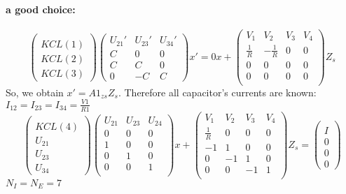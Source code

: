 \paragraph{a good choice:}
\[\left(\begin{array}{c}
  \\
KCL(1)\\KCL(2)\\KCL(3)
\end{array}\right)
\left(\begin{array}{ccc}
  U_{21}'&U_{23}'&U_{34}'\\
  \hline
  C&0&0\\
  C&C&0\\
  0&-C&C
\end{array}\right)x'=0x+
\left(\begin{array}{cccc}
  V_{1}&V_{2}&V_{3}&V_{4}\\
  \hline
  \frac{1}{R}&-\frac{1}{R}&0&0\\
  0&0&0&0\\
  0&0&0&0\\
\end{array}\right)Z_{s}
 \]
 So, we obtain $x'=A1_{zs}Z_{s}$. Therefore all capacitor's currents are known: $I_{12}=I_{23}=I_{34}=\frac{V1}{R1}$\\
 \[\left(\begin{array}{c}
  \\
KCL(4)\\U_{21}\\U_{23}\\U_{34}
\end{array}\right)
 \left(\begin{array}{ccc}
  U_{21}&U_{23}&U_{24}\\
  \hline
  0&0&0\\
  1&0&0\\
  0&1&0\\
  0&0&1\\
\end{array}\right)x+
 \left(\begin{array}{cccc}
  V_{1}&V_{2}&V_{3}&V_{4}\\
  \hline
  \frac{1}{R}&0&0&0\\
  -1&1&0&0\\
  0&-1&1&0\\
  0&0&-1&1\\
\end{array}\right)Z_{s}=
 \left(\begin{array}{c}
  \\I\\0\\0\\0
\end{array}\right)
 \]
$N_{I}=N_{E}=7$\\





